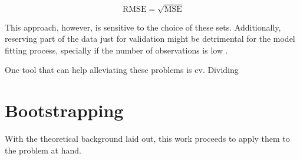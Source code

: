 \begin{equation} 
	\label{eqn:rmse}
	\text{RMSE} = \sqrt{\text{MSE}}
\end{equation}
 
This approach, however,  is sensitive to the choice of these sets. Additionally, reserving part of the data just for validation might be detrimental for the model fitting process, specially if the number of observations is low \parencite{james2013introduction}.

One tool that can help alleviating these problems is \acrfull{cv}. Dividing





\section{Bootstrapping}
\label{sec:hypot}


With the theoretical background laid out, this work proceeds to apply them to the problem at hand.


